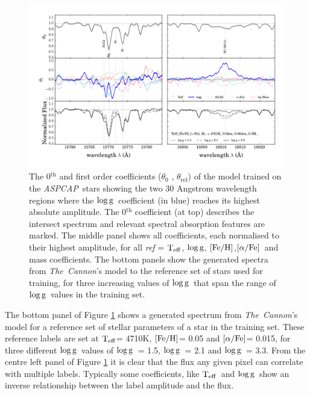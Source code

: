 \documentclass[12pt, preprint]{aastex}
\newcommand{\project}[1]{\textsl{#1}}
\newcommand{\tc}{\project{The~Cannon}}
\newcommand{\aspcap}{\project{ASPCAP}}
\newcommand{\teff}{\mbox{$\rm T_{eff}$}}
\newcommand{\feh}{\mbox{$\rm [Fe/H]$}}
\newcommand{\alphafe}{\mbox{$\rm [\alpha/Fe]$}}
\newcommand{\logg}{\mbox{$\rm \log g$}}
\begin{document}
\begin{figure}[h!]
\centering
    \includegraphics[scale=0.51]{./plots/coeffs_g_3.png}
  \caption{The 0$^{\mbox{th}}$ and first order coefficients ($\theta_0$ , $\theta_{\mbox{ref}}$) of the model trained on the \aspcap\ stars showing the two 30 Angstrom wavelength regions where the \logg\ coefficient (in blue) reaches its highest absolute amplitude. The 0$^{\mbox{th}}$ coefficient (at top) describes the intersect spectrum and relevant spectral absorption features are marked. The middle panel shows all coefficients, each normalised to their highest amplitude, for all \textit{ref} = \teff, \logg, \feh,\alphafe\ and mass coefficients. The bottom panels show the generated spectra from \tc's model to the reference set of stars used for training, for three increasing values of \logg\ that span the range of \logg\ values in the training set.}
\label{fig:logg}
\end{figure}

The bottom panel of Figure  \ref{fig:logg} shows a generated spectrum from \tc's model for a reference set of stellar parameters of a star in the training set. These reference labels are set at \teff = 4710K, \feh = 0.05 and \alphafe = 0.015, for three different \logg\ values of \logg\ = 1.5, \logg\ = 2.1 and \logg\ = 3.3. From the centre left panel of Figure \ref{fig:logg} it is clear that the flux any given pixel can correlate with multiple labels. Typically some coefficients, like \teff\ and \logg\ show an inverse relationship between the label amplitude and the flux.
\end{document}
